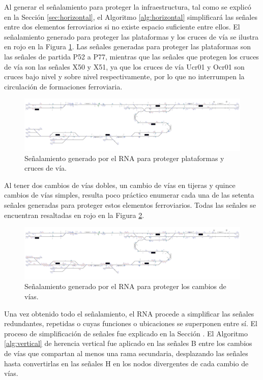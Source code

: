 	Al generar el señalamiento para proteger la infraestructura, tal como se explicó en la Sección \ref{sec:horizontal}, el Algoritmo \ref{alg:horizontal} simplificará las señales entre dos elementos ferroviarios si no existe espacio suficiente entre ellos. El señalamiento generado para proteger las plataformas y los cruces de vía se ilustra en rojo en la Figura \ref{fig:EJ3_5}. Las señales generadas para proteger las plataformas son las señales de partida P52 a P77, mientras que las señales que protegen los cruces de vía son las señales X50 y X51, ya que los cruces de vía Ucr01 y Ocr01 son cruces bajo nivel y sobre nivel respectivamente, por lo que no interrumpen la circulación de formaciones ferroviaria.
	
	\begin{figure}[H]
		\centering
		\includegraphics[width=1\textwidth]{resultados-obtenidos/ejemplo3/images/3_step3.png}
		\centering\caption{Señalamiento generado por el RNA para proteger plataformas y cruces de vía.}
		\label{fig:EJ3_5}
	\end{figure}
	
	Al tener dos cambios de vías dobles, un cambio de vías en tijeras y quince cambios de vías simples, resulta poco práctico enumerar cada una de las setenta señales generadas para proteger estos elementos ferroviarios. Todas las señales se encuentran resaltadas en rojo en la Figura \ref{fig:EJ3_6}.
	
	\begin{figure}[H]
		\centering
		\includegraphics[width=1\textwidth]{resultados-obtenidos/ejemplo3/images/3_step4.png}
		\centering\caption{Señalamiento generado por el RNA para proteger los cambios de vías.}
		\label{fig:EJ3_6}
	\end{figure}
	
	Una vez obtenido todo el señalamiento, el RNA procede a simplificar las señales redundantes, repetidas o cuyas funciones o ubicaciones se superponen entre sí. El proceso de simplificación de señales fue explicado en la Sección \label{sec:simplificacion}. El Algoritmo \ref{alg:vertical} de herencia vertical fue aplicado en las señales B entre los cambios de vías que compartan al menos una rama secundaria, desplazando las señales hasta convertirlas en las señales H en los nodos divergentes de cada cambio de vías. 
	
